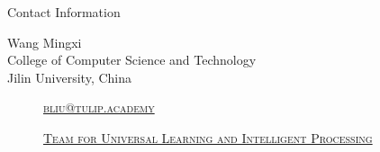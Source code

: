 \documentclass[
 size=14pt,
 paper=smartboard,  %
 mode=present, 		%
 display=slides, 	%
 style=tuliplab,  	%
 pauseslide,
 fleqn,leqno]{powerdot}
\begin{document}
\begin{wideslide}[toc=,bm=]{Contact Information}
\centering
{}
\twocolumn[
lcolwidth=0.35\linewidth,
rcolwidth=0.65\linewidth
]
{
}
{
Wang Mingxi\\
College of Computer Science and Technology\\
Jilin University, China
\begin{description}
 \item[\textcolor{orange}{\faEnvelope}] \href{mailto:bliu@tulip.academy}
 {\textsc{\footnotesize{bliu@tulip.academy}}}

 \item[\textcolor{orange}{\faHome}] \href{http://www.tulip.org.au}
 {\textsc{\footnotesize{Team for Universal Learning and Intelligent Processing}}}
\end{description}
}
\end{wideslide}
\end{document}
